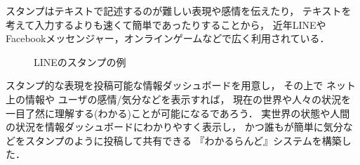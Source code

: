 スタンプはテキストで記述するのが難しい表現や感情を伝えたり，
テキストを考えて入力するよりも速くて簡単であったりすることから，
近年LINEやFacebookメッセンジャー，オンラインゲームなどで広く利用されている．

\begin{figure}[H]
\centering{}
\caption{LINEのスタンプの例}
\label{linestamp}
\end{figure}

スタンプ的な表現を投稿可能な情報ダッシュボードを用意し，
その上で
ネット上の情報や
ユーザの感情/気分などを表示すれば，
現在の世界や人々の状況を一目了然に理解する(わかる)ことが可能になるであろう．
%
実世界の状態や人間の状況を情報ダッシュボードにわかりやすく表示し，
かつ誰もが簡単に気分などをスタンプのように投稿して共有できる
『わかるらんど』システムを構築した．



